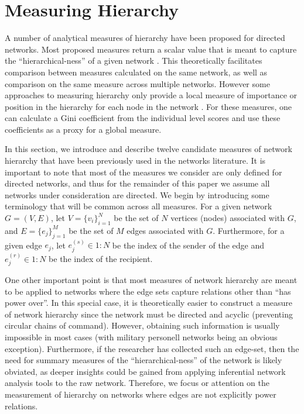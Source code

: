 \documentclass[3p,times]{elsarticle}
\begin{document}
%
%

\section{Measuring Hierarchy}
A number of analytical measures of hierarchy have been proposed for directed networks. Most proposed measures return a scalar value that is meant to capture the ``hierarchical-ness'' of a given network \cite{Mones2012, Shizuka2012, bonacich1972factoring, freeman1977set, Kendall1940, landau1951dominance, Suchecki2013a}. This theoretically facilitates comparison between measures calculated on the same network, as well as comparison on the same measure across multiple networks. However some approaches to measuring hierarchy only provide a local measure of importance or position in the hierarchy for each node in the network \cite{an2015multilevel}. For these measures, one can calculate a Gini coefficient \cite{yitzhaki1979relative} from the individual level scores and use these coefficients as a proxy for a global measure. 

In this section, we introduce and describe twelve candidate measures of network hierarchy that have been previously used in the networks literature. It is important to note that most of the measures we consider are only defined for directed networks, and thus for the remainder of this paper we assume all networks under consideration are directed. We begin by introducing some terminology that will be common across all measures. For a given network $G=(V,E)$, let $V=\{v_i\}_{i=1}^N$ be the set of $N$ vertices (nodes) associated with $G$, and $E=\{e_j\}_{j=1}^M$ be the set of $M$ edges associated with $G$. Furthermore, for a given edge $e_j$, let $e_j^{(s)} \in 1:N$ be the index of the sender of the edge and $e_j^{(r)} \in 1:N$ be the index of the recipient. 

One other important point is that most measures of network hierarchy are meant to be applied to networks where the edge sets capture relations other than ``has power over''. In this special case, it is theoretically easier to construct a measure of network hierarchy since the network must be directed and acyclic (preventing circular chains of command). However, obtaining such information is usually impossible in most cases (with military personell networks being an obvious exception). Furthermore, if the researcher has collected such an edge-set, then the need for summary measures of the ``hierarchical-ness'' of the network is likely obviated, as deeper insights could be gained from applying inferential network analysis tools to the raw network. Therefore, we focus or attention on the measurement of hierarchy on networks where edges are not explicitly power relations.
\end{document}
